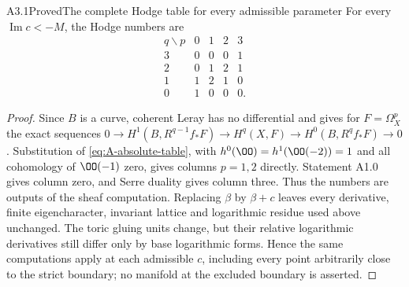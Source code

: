 \begin{claim}{A3.1}{Proved}{The complete Hodge table for every admissible parameter}
For every $\operatorname{Im}c<-M$, the Hodge numbers are
\[
\begin{array}{c|rrrr}
q\backslash p&0&1&2&3\\\hline
3&0&0&0&1\\
2&0&1&2&1\\
1&1&2&1&0\\
0&1&0&0&0.
\end{array}
\]
\end{claim}
\begin{proof}
Since $B$ is a curve, coherent Leray has no differential and gives
for $F=\Omega_X^p$ the exact sequences
$0\to H^1(B,R^{q-1}f_*F)\to H^q(X,F)\to H^0(B,R^qf_*F)\to0$.
Substitution of \eqref{eq:A-absolute-table}, with
$h^0(\OO)=h^1(\OO(-2))=1$ and all cohomology of $\OO(-1)$ zero,
gives columns $p=1,2$ directly.  Statement A1.0 gives column zero,
and Serre duality gives column three.  Thus the numbers are outputs
of the sheaf computation.  Replacing $\beta$ by $\beta+c$ leaves
every derivative, finite eigencharacter, invariant lattice and
logarithmic residue used above unchanged.  The toric gluing units
change, but their relative logarithmic derivatives still differ only
by base logarithmic forms.  Hence the same computations apply at
each admissible $c$, including every point arbitrarily close to the
strict boundary; no manifold at the excluded boundary is asserted.
\end{proof}
